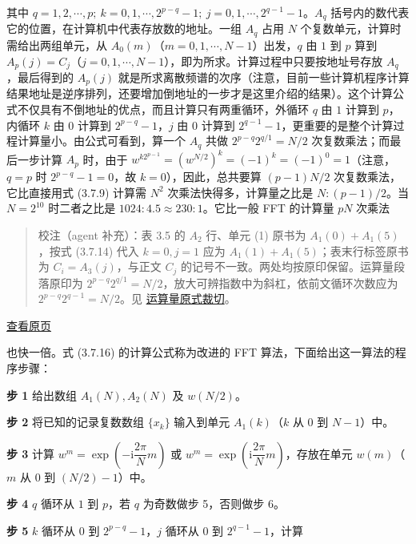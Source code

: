 \documentclass[
  10pt,
  fontset=fandol]{ctexart}
\begin{document}
其中 \(q=1,\allowbreak 2,\allowbreak \cdots,\allowbreak p;\ k=0,\allowbreak 1,\allowbreak \cdots,\allowbreak 2^{p-q}-1;\ j=0,\allowbreak 1,\allowbreak \cdots,\allowbreak 2^{q-1}-1\)。\(A_q\) 括号内的数代表它的位置，在计算机中代表存放数的地址。一组 \(A_q\) 占用 \(N\) 个复数单元，计算时需给出两组单元，从 \(A_0(m)\)（\(m=0,1,\cdots,N-1\)）出发，\(q\) 由 \(1\) 到 \(p\) 算到 \(A_p(j)=C_j\)（\(j=0,1,\cdots,N-1\)），即为所求。计算过程中只要按地址号存放 \(A_q\)，最后得到的 \(A_p(j)\) 就是所求离散频谱的次序（注意，目前一些计算机程序计算结果地址是逆序排列，还要增加倒地址的一步才是这里介绍的结果）。这个计算公式不仅具有不倒地址的优点，而且计算只有两重循环，外循环 \(q\) 由 \(1\) 计算到 \(p\)，内循环 \(k\) 由 \(0\) 计算到 \(2^{p-q}-1\)，\(j\) 由 \(0\) 计算到 \(2^{q-1}-1\)，更重要的是整个计算过程计算量小。由公式可看到，算一个 \(A_q\) 共做 \(2^{p-q}2^{q/1}=N/2\) 次复数乘法；而最后一步计算 \(A_p\) 时，由于 \(w^{k2^{p-1}}=(w^{N/2})^k=(-1)^k=(-1)^0=1\)（注意，\(q=p\) 时 \(2^{p-q}-1=0\)，故 \(k=0\)），因此，总共要算 \((p-1)N/2\) 次复数乘法，它比直接用式 (3.7.9) 计算需 \(N^2\) 次乘法快得多，计算量之比是 \(N:(p-1)/2\)。当 \(N=2^{10}\) 时二者之比是 \(1024:4.5\approx230:1\)。它比一般 FFT 的计算量 \(pN\) 次乘法

\begin{quote}
校注（agent 补充）：表 3.5 的 \(A_2\) 行、单元 (1) 原书为 \(A_1(0)+A_1(5)\)，按式 (3.7.14) 代入 \(k=0,j=1\) 应为 \(A_1(1)+A_1(5)\)；表末行标签原书为 \(C_i=A_3(j)\)，与正文 \(C_j\) 的记号不一致。两处均按原印保留。运算量段落原印为 \(2^{p-q}2^{q/1}=N/2\)，放大可辨指数中为斜杠，依前文循环次数应为 \(2^{p-q}2^{q-1}=N/2\)。见 \href{../assets/ch03b/p089-operation-count.png}{运算量原式裁切}。
\end{quote}

\href{../../source-images/pdf-090.jpeg}{查看原页}

也快一倍。式 (3.7.16) 的计算公式称为改进的 FFT 算法，下面给出这一算法的程序步骤：

\textbf{步 1} 给出数组 \(A_1(N),A_2(N)\) 及 \(w(N/2)\)。

\textbf{步 2} 将已知的记录复数数组 \(\{x_k\}\) 输入到单元 \(A_1(k)\)（\(k\) 从 \(0\) 到 \(N-1\)）中。

\textbf{步 3} 计算 \(w^m=\exp\left(-\mathrm i\dfrac{2\pi}{N}m\right)\) 或 \(w^m=\exp\left(\mathrm i\dfrac{2\pi}{N}m\right)\)，存放在单元 \(w(m)\)（\(m\) 从 \(0\) 到 \((N/2)-1\)）中。

\textbf{步 4} \(q\) 循环从 \(1\) 到 \(p\)，若 \(q\) 为奇数做步 5，否则做步 6。

\textbf{步 5} \(k\) 循环从 \(0\) 到 \(2^{p-q}-1\)，\(j\) 循环从 \(0\) 到 \(2^{q-1}-1\)，计算
\end{document}
